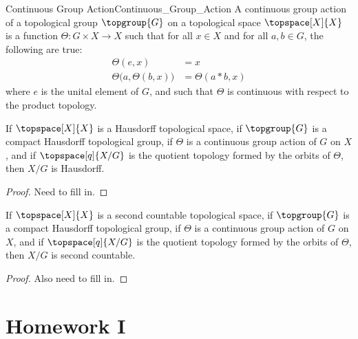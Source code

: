 \documentclass{article}                                                        %
\begin{document}
            \begin{fdefinition}{Continuous Group Action}{Continuous_Group_Action}
                A continuous group action of a topological group $\topgroup{G}$
                on a topological space $\topspace[X]{X}$ is a function
                $\Theta:G\times{X}\rightarrow{X}$ such that for all $x\in{X}$ and
                for all $a,b\in{G}$, the following are true:
                \begin{align*}
                    \Theta(e,x)&=x\\
                    \Theta\big(a,\Theta(b,x)\big)&=\Theta(a*b,x)
                \end{align*}
                where $e$ is the unital element of $G$, and such that $\Theta$ is
                continuous with respect to the product topology.
            \end{fdefinition}
            \begin{theorem}
                \label{thm:Quotient_by_Compact_T2_Group_Preserves_T2}%
                If $\topspace[X]{X}$ is a Hausdorff topological space, if
                $\topgroup{G}$ is a compact Hausdorff topological group, if
                $\Theta$ is a continuous group action of $G$ on $X$, and if
                $\topspace[q]{X/G}$ is the quotient topology formed by the orbits
                of $\Theta$, then $X/G$ is Hausdorff.
            \end{theorem}
            \begin{proof}
                Need to fill in.
            \end{proof}
            \begin{theorem}
                \label{thm:Quotient_by_Compact_T2_Group_Preserves_Sec_Count}%
                If $\topspace[X]{X}$ is a second countable topological space, if
                $\topgroup{G}$ is a compact Hausdorff topological group, if
                $\Theta$ is a continuous group action of $G$ on $X$, and if
                $\topspace[q]{X/G}$ is the quotient topology formed by the orbits
                of $\Theta$, then $X/G$ is second countable.
            \end{theorem}
            \begin{proof}
                Also need to fill in.
            \end{proof}
    \section{Homework I}
\end{document}
